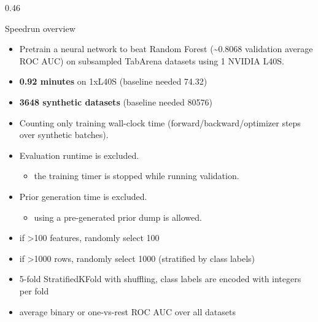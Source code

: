 \documentclass[final]{beamer}
\begin{document}
\begin{frame}[t]
\begin{columns}[t]
\begin{column}{0.46\paperwidth}
\begin{block}{Speedrun overview}

      \begin{itemize}
        \item Pretrain a neural network to beat Random Forest (\textasciitilde 0.8068 validation average ROC AUC) on subsampled TabArena datasets using 1 NVIDIA L40S.
      \end{itemize}


      \begin{itemize}
        \item \textbf{0.92 minutes} on 1xL40S (baseline needed 74.32)
        \item \textbf{3648 synthetic datasets} (baseline needed 80576)
      \end{itemize}


    \begin{itemize}
      \item Counting only training wall-clock time (forward/backward/optimizer steps over synthetic batches).
      \item Evaluation runtime is excluded.
      \begin{itemize}
        \item the training timer is stopped while running validation.
      \end{itemize}
      \item Prior generation time is excluded.
      \begin{itemize}
        \item using a pre-generated prior dump is allowed.
      \end{itemize}
    \end{itemize}


    \begin{itemize}
      \item if >100 features, randomly select 100
      \item if >1000 rows, randomly select 1000 (stratified by class labels)
      \item 5-fold StratifiedKFold with shuffling, class labels are encoded with integers per fold
      \item average binary or one-vs-rest ROC AUC over all datasets
    \end{itemize}


\end{block}
\end{column}
\end{columns}
\end{frame}
\end{document}
